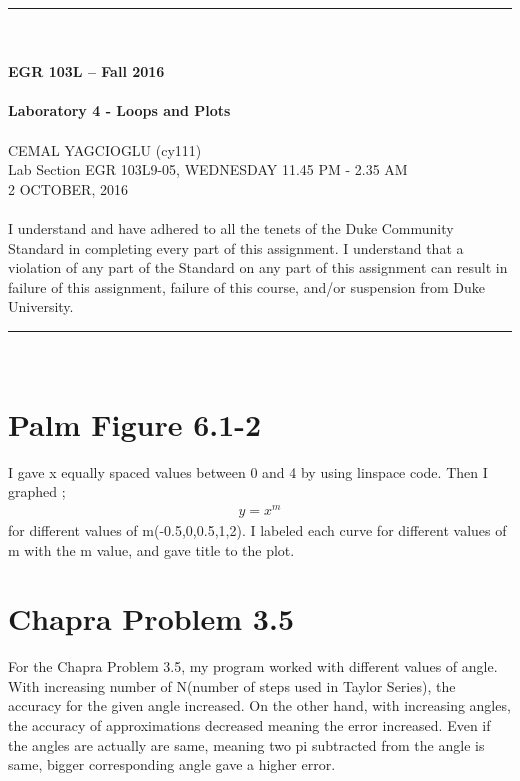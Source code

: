 \documentclass{article}
\begin{document}
\begin{center}
\rule{6.5in}{0.5mm}\\~\\
{\bf \large EGR 103L -- Fall 2016}\\~\\
{\huge \bf Laboratory 4 - Loops and Plots}\\~\\
CEMAL YAGCIOGLU (cy111)\\
Lab Section EGR 103L9-05, WEDNESDAY 11.45 PM - 2.35 AM\\
2 OCTOBER, 2016\\~\\
{\small I understand and have adhered to all the tenets of the Duke
  Community Standard in completing every part of this assignment.  I
  understand that a violation of any part of the Standard on any part
  of this assignment can result in failure of this assignment, failure
  of this course, and/or suspension from Duke University.} 
\rule{6.5in}{0.5mm}\\
\end{center}
\tableofcontents
\listoffigures
\pagebreak


\section{Palm Figure 6.1-2}
I gave x equally spaced values between 0 and 4 by using linspace code. Then I graphed \cite[p.~265]{Palm}; \begin{align} y=x^m \end{align} for different values of m(-0.5,0,0.5,1,2). I labeled each curve for different values of m with the m value, and gave title to the plot.


\section{Chapra Problem 3.5}
For the Chapra Problem 3.5, my program worked with different values of angle. With increasing number of N(number of steps used in Taylor Series), the accuracy for the given angle increased. On the other hand, with increasing angles, the accuracy of approximations decreased meaning the error increased. Even if the angles are actually are same, meaning two pi subtracted from the angle is same, bigger corresponding angle gave a higher error.
\end{document}
